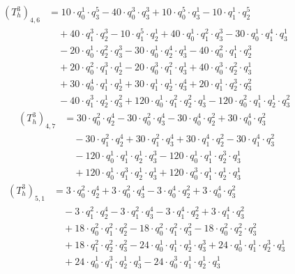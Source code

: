 \begin{align*}(T_{h}^3)_{4,6}&=10\cdot q_0^{1}\cdot q_3^{5}-40\cdot q_0^{3}\cdot q_3^{3}+10\cdot q_0^{5}\cdot q_3^{1}-10\cdot q_1^{1}\cdot q_2^{5}\\
&\quad +40\cdot q_1^{3}\cdot q_2^{3}-10\cdot q_1^{5}\cdot q_2^{1}+40\cdot q_0^{1}\cdot q_1^{2}\cdot q_3^{3}-30\cdot q_0^{1}\cdot q_1^{4}\cdot q_3^{1}\\
&\quad -20\cdot q_0^{1}\cdot q_2^{2}\cdot q_3^{3}-30\cdot q_0^{1}\cdot q_2^{4}\cdot q_3^{1}-40\cdot q_0^{2}\cdot q_1^{1}\cdot q_2^{3}\\
&\quad +20\cdot q_0^{2}\cdot q_1^{3}\cdot q_2^{1}-20\cdot q_0^{3}\cdot q_1^{2}\cdot q_3^{1}+40\cdot q_0^{3}\cdot q_2^{2}\cdot q_3^{1}\\
&\quad +30\cdot q_0^{4}\cdot q_1^{1}\cdot q_2^{1}+30\cdot q_1^{1}\cdot q_2^{1}\cdot q_3^{4}+20\cdot q_1^{1}\cdot q_2^{3}\cdot q_3^{2}\\
&\quad -40\cdot q_1^{3}\cdot q_2^{1}\cdot q_3^{2}+120\cdot q_0^{1}\cdot q_1^{2}\cdot q_2^{2}\cdot q_3^{1}-120\cdot q_0^{2}\cdot q_1^{1}\cdot q_2^{1}\cdot q_3^{2}\end{align*}
\begin{align*}(T_{h}^3)_{4,7}&=30\cdot q_0^{2}\cdot q_2^{4}-30\cdot q_0^{2}\cdot q_3^{4}-30\cdot q_0^{4}\cdot q_2^{2}+30\cdot q_0^{4}\cdot q_3^{2}\\
&\quad -30\cdot q_1^{2}\cdot q_2^{4}+30\cdot q_1^{2}\cdot q_3^{4}+30\cdot q_1^{4}\cdot q_2^{2}-30\cdot q_1^{4}\cdot q_3^{2}\\
&\quad -120\cdot q_0^{1}\cdot q_1^{1}\cdot q_2^{1}\cdot q_3^{3}-120\cdot q_0^{1}\cdot q_1^{1}\cdot q_2^{3}\cdot q_3^{1}\\
&\quad +120\cdot q_0^{1}\cdot q_1^{3}\cdot q_2^{1}\cdot q_3^{1}+120\cdot q_0^{3}\cdot q_1^{1}\cdot q_2^{1}\cdot q_3^{1}\end{align*}
\begin{align*}(T_{h}^3)_{5,1}&=3\cdot q_0^{2}\cdot q_2^{4}+3\cdot q_0^{2}\cdot q_3^{4}-3\cdot q_0^{4}\cdot q_2^{2}+3\cdot q_0^{4}\cdot q_3^{2}\\
&\quad -3\cdot q_1^{2}\cdot q_2^{4}-3\cdot q_1^{2}\cdot q_3^{4}-3\cdot q_1^{4}\cdot q_2^{2}+3\cdot q_1^{4}\cdot q_3^{2}\\
&\quad +18\cdot q_0^{2}\cdot q_1^{2}\cdot q_2^{2}-18\cdot q_0^{2}\cdot q_1^{2}\cdot q_3^{2}-18\cdot q_0^{2}\cdot q_2^{2}\cdot q_3^{2}\\
&\quad +18\cdot q_1^{2}\cdot q_2^{2}\cdot q_3^{2}-24\cdot q_0^{1}\cdot q_1^{1}\cdot q_2^{1}\cdot q_3^{3}+24\cdot q_0^{1}\cdot q_1^{1}\cdot q_2^{3}\cdot q_3^{1}\\
&\quad +24\cdot q_0^{1}\cdot q_1^{3}\cdot q_2^{1}\cdot q_3^{1}-24\cdot q_0^{3}\cdot q_1^{1}\cdot q_2^{1}\cdot q_3^{1}\end{align*}

